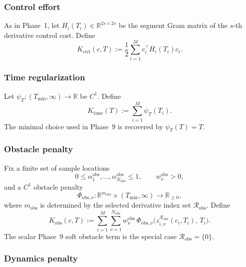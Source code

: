 \subsubsection{Control effort}
\label{subsubsec:phase10_ctrl}

As in Phase~1, let \(H_i(T_i)\in\mathbb R^{2s\times 2s}\) be the segment Gram matrix of the \(s\)-th derivative control cost.
Define
\begin{equation}
\label{eq:phase10_Kctrl}
K_{\mathrm{ctrl}}(c,T)
:=
\frac12\sum_{i=1}^{M} c_i^\top H_i(T_i)c_i.
\end{equation}

\subsubsection{Time regularization}
\label{subsubsec:phase10_time}

Let \(\psi_T:(T_{\min},\infty)\to\mathbb R\) be \(C^1\).
Define
\begin{equation}
\label{eq:phase10_Ktime}
K_{\mathrm{time}}(T)
:=
\sum_{i=1}^{M}\psi_T(T_i).
\end{equation}
The minimal choice used in Phase~9 is recovered by \(\psi_T(T)=T\).

\subsubsection{Obstacle penalty}
\label{subsubsec:phase10_obs}

Fix a finite set of sample locations
\[
0\le \alpha_1^{\mathrm{obs}},\dots,\alpha_{N_{\mathrm{obs}}}^{\mathrm{obs}}\le 1,
\qquad
w_\nu^{\mathrm{obs}}>0,
\]
and a \(C^1\) obstacle penalty
\[
\Phi_{\mathrm{obs},\nu}:\mathbb R^{m_{\mathrm{obs}}}\times (T_{\min},\infty)\to\mathbb R_{\ge 0},
\]
where \(m_{\mathrm{obs}}\) is determined by the selected derivative index set \(\mathcal R_{\mathrm{obs}}\).
Define
\begin{equation}
\label{eq:phase10_Kobs}
K_{\mathrm{obs}}(c,T)
:=
\sum_{i=1}^{M}\sum_{\nu=1}^{N_{\mathrm{obs}}}
w_\nu^{\mathrm{obs}}\,
\Phi_{\mathrm{obs},\nu}
\bigl(
z_{i,\nu}^{\mathcal R_{\mathrm{obs}}}(c_i,T_i),\,T_i
\bigr).
\end{equation}
The scalar Phase~9 soft obstacle term is the special case \(\mathcal R_{\mathrm{obs}}=\{0\}\).

\subsubsection{Dynamics penalty}
\label{subsubsec:phase10_dyn}

